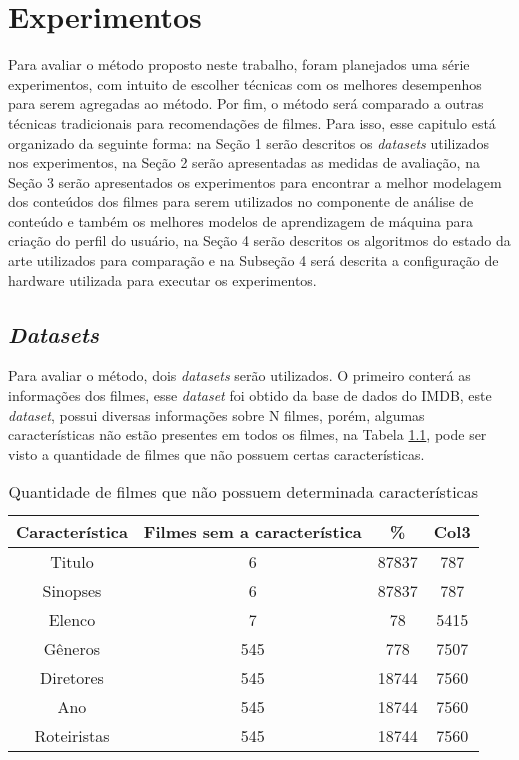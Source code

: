 \chapter{Experimentos}\label{cap_exemplos}
Para avaliar o método proposto neste trabalho, foram planejados uma série experimentos, com intuito de escolher técnicas com os melhores desempenhos para serem agregadas ao método. Por fim, o método será comparado a outras técnicas tradicionais para recomendações de filmes. Para isso, esse capitulo está organizado da seguinte forma: na Seção 1 serão descritos os \textit{datasets} utilizados nos experimentos, na Seção 2 serão apresentadas as medidas de avaliação, na Seção 3 serão apresentados os experimentos para encontrar a melhor modelagem dos conteúdos dos filmes para serem utilizados no componente de análise de conteúdo e também os melhores modelos de aprendizagem de máquina para criação do perfil do usuário,   na Seção 4 serão descritos os algoritmos do estado da arte utilizados para comparação e na Subseção 4 será descrita a configuração de hardware utilizada para executar os experimentos. 

\section{\textit{Datasets}}
Para avaliar o método, dois \textit{datasets} serão utilizados. O primeiro conterá as informações dos filmes, esse \textit{dataset} foi obtido da base de dados do IMDB, este \textit{dataset}, possui diversas informações sobre N filmes, porém, algumas características não estão presentes em todos os filmes, na Tabela \ref{tab:missing_values}, pode ser visto a quantidade de filmes que não possuem certas características.
\begin{table}[h]
\label{tab:missing_values}
 \centering
\begin{tabular}{|c| c c c|}
\hline
Característica &  Filmes sem a característica & \% & Col3 \\ 
\hline
Titulo & 6 & 87837 & 787 \\ 
\hline
Sinopses & 6 & 87837 & 787 \\ 
\hline
Elenco & 7 & 78 & 5415 \\
\hline
Gêneros & 545 & 778 & 7507 \\
\hline
Diretores & 545 & 18744 & 7560 \\
\hline
Ano & 545 & 18744 & 7560 \\
\hline    
Roteiristas & 545 & 18744 & 7560 \\
\hline
\end{tabular}
\caption{\label{tab:missing_values}Quantidade de filmes que não possuem determinada características}
\end{table}


